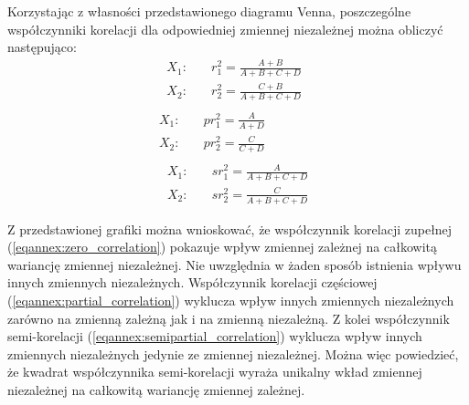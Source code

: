 \begin{appendices}
Korzystając z własności przedstawionego diagramu Venna, poszczególne współczynniki korelacji dla odpowiedniej zmiennej niezależnej można obliczyć następująco:
\begin{equation} \label{eqannex:zero_correlation}
	\begin{split}
		X_1:\quad& r_1^2 = \frac{A+B}{A+B+C+D} \phantom{\;\;}\\
		X_2:\quad& r_2^2 = \frac{C+B}{A+B+C+D} \\
	\end{split}
\end{equation}
\begin{equation} \label{eqannex:partial_correlation}
	\begin{split}
		X_1:\quad& pr_1^2 = \frac{A}{A+D} \phantom{\qquad\qquad}\\
		X_2:\quad& pr_2^2 = \frac{C}{C+D} \\
	\end{split}
\end{equation}
\begin{equation} \label{eqannex:semipartial_correlation}
	\begin{split}
		X_1:\quad& sr_1^2 = \frac{A}{A+B+C+D} \\
		X_2:\quad& sr_2^2 = \frac{C}{A+B+C+D} 
	\end{split}
\end{equation}

Z przedstawionej grafiki można wnioskować, że współczynnik korelacji zupełnej (\ref{eqannex:zero_correlation}) pokazuje wpływ zmiennej zależnej na całkowitą wariancję zmiennej niezależnej. Nie uwzględnia w żaden sposób istnienia wpływu innych zmiennych niezależnych. Współczynnik korelacji częściowej (\ref{eqannex:partial_correlation}) wyklucza wpływ innych zmiennych niezależnych zarówno na zmienną zależną jak i na zmienną niezależną. Z kolei współczynnik semi-korelacji (\ref{eqannex:semipartial_correlation}) wyklucza wpływ innych zmiennych niezależnych jedynie ze zmiennej niezależnej. Można więc powiedzieć, że kwadrat współczynnika semi-korelacji wyraża unikalny wkład zmiennej niezależnej na całkowitą wariancję zmiennej zależnej.






\end{appendices}